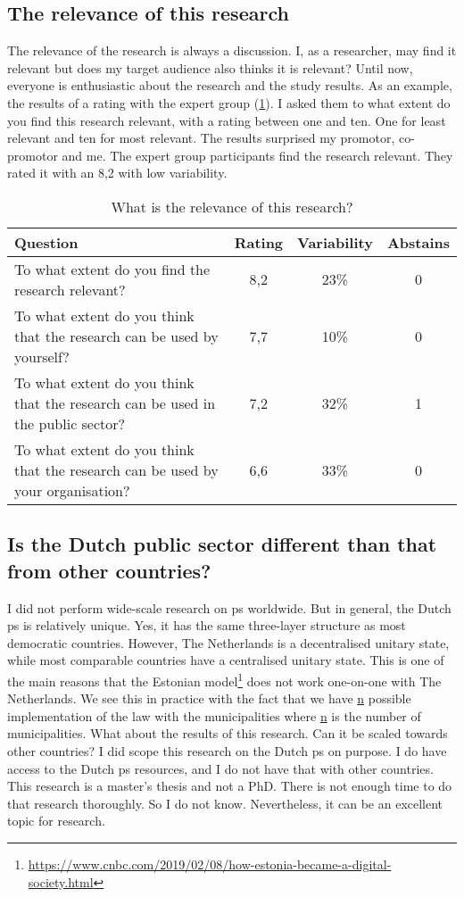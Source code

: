 \subsection{The relevance of this research}
\label{sub:relevanceofresearch}
The relevance of the research is always a discussion. I, as a researcher, may find it relevant but does my target audience also thinks it is relevant? Until now, everyone is enthusiastic about the research and the study results. As an example, the results of a rating with the expert group (\cref{tab:relevance}). I asked them to what extent do you find this research relevant, with a rating between one and ten. One for least relevant and ten for most relevant. The results surprised my promotor, co-promotor and me. The expert group participants find the research relevant. They rated it with an 8,2 with low variability.
\begin{table}[H]
	\centering
	\begin{tabular}{p{}ccc}
		\toprule
		\textbf{Question} & \textbf{Rating} & \textbf{Variability} & \textbf{Abstains} \\
		\midrule
		To what extent do you find the research relevant? & 8,2 & 23\% & 0 \\%
		To what extent do you think that the research can be used by yourself? & 7,7 & 10\% & 0 \\%
		To what extent do you think that the research can be used in the public sector? & 7,2 & 32\% & 1 \\%
		To what extent do you think that the research can be used by your organisation? & 6,6 & 33\% & 0 \\%
		\bottomrule
	\end{tabular}%
	\caption[What is the relevance of this research?]{What is the relevance of this research?}
	\label{tab:relevance}%
\end{table}%

\subsection{Is the Dutch public sector different than that from other countries?}
\label{sub:differencepublicsector}
I did not perform wide-scale research on \gls{ps} worldwide. But in general, the Dutch \gls{ps} is relatively unique. Yes, it has the same three-layer structure as most democratic countries. However, The Netherlands is a decentralised unitary state, while most comparable countries have a centralised unitary state. This is one of the main reasons that the Estonian model\footnote{\url{https://www.cnbc.com/2019/02/08/how-estonia-became-a-digital-society.html}} does not work one-on-one with The Netherlands. We see this in practice with the fact that we have \underline{n} possible implementation of the law with the municipalities where \underline{n} is the number of municipalities. What about the results of this research. Can it be scaled towards other countries? I did scope this research on the Dutch \gls{ps} on purpose. I do have access to the Dutch \gls{ps} resources, and I do not have that with other countries. This research is a master's thesis and not a PhD. There is not enough time to do that research thoroughly. So I do not know. Nevertheless, it can be an excellent topic for research.

